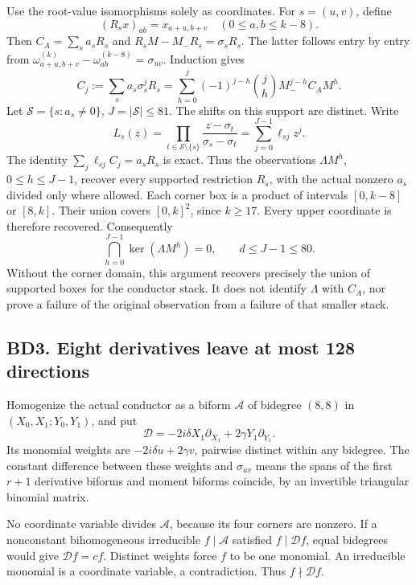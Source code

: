 \documentclass[11pt]{article}
\begin{document}
Use the root-value isomorphisms solely as coordinates. For \(s=(u,v)\), define \[
(R_sx)_{ab}=x_{a+u,b+v}\quad(0\le a,b\le k-8).
\] Then \(C_A=\sum_s a_sR_s\) and \(R_sM-M_-R_s=\sigma_sR_s\). The latter follows entry by entry from \(\omega_{a+u,b+v}^{(k)}-\omega_{ab}^{(k-8)}=\sigma_{uv}\). Induction gives \[
C_j:=\sum_s a_s\sigma_s^jR_s
=\sum_{h=0}^j(-1)^{j-h}\binom jh M_-^{j-h}C_AM^h. \tag{BD2}
\] Let \(\mathcal S=\{s:a_s\ne0\}\), \(J=|\mathcal S|\le81\). The shifts on this support are distinct. Write \[
L_s(z)=\prod_{t\in\mathcal S\setminus\{s\}}\frac{z-\sigma_t}{\sigma_s-\sigma_t}
=\sum_{j=0}^{J-1}\ell_{sj}z^j.
\] The identity \(\sum_j\ell_{sj}C_j=a_sR_s\) is exact. Thus the observations \(\Lambda M^h\), \(0\le h\le J-1\), recover every supported restriction \(R_s\), with the actual nonzero \(a_s\) divided only where allowed. Each corner box is a product of intervals \([0,k-8]\) or \([8,k]\). Their union covers \([0,k]^2\), since \(k\ge17\). Every upper coordinate is therefore recovered. Consequently \[
\bigcap_{h=0}^{J-1}\ker(\Lambda M^h)=0,\qquad d\le J-1\le80. \tag{BD3}
\] Without the corner domain, this argument recovers precisely the union of supported boxes for the conductor stack. It does not identify \(\Lambda\) with \(C_A\), nor prove a failure of the original observation from a failure of that smaller stack.

\subsection{BD3. Eight derivatives leave at most 128 directions}\label{bd3.-eight-derivatives-leave-at-most-128-directions}

Homogenize the actual conductor as a biform \(\mathcal A\) of bidegree \((8,8)\) in \((X_0,X_1;Y_0,Y_1)\), and put \[
\mathcal D=-2i\delta X_1\partial_{X_1}+2\gamma Y_1\partial_{Y_1}.
\] Its monomial weights are \(-2i\delta u+2\gamma v\), pairwise distinct within any bidegree. The constant difference between these weights and \(\sigma_{uv}\) means the spans of the first \(r+1\) derivative biforms and moment biforms coincide, by an invertible triangular binomial matrix.

No coordinate variable divides \(\mathcal A\), because its four corners are nonzero. If a nonconstant bihomogeneous irreducible \(f\mid\mathcal A\) satisfied \(f\mid\mathcal Df\), equal bidegrees would give \(\mathcal Df=cf\). Distinct weights force \(f\) to be one monomial. An irreducible monomial is a coordinate variable, a contradiction. Thus \(f\nmid\mathcal Df\).
\end{document}
